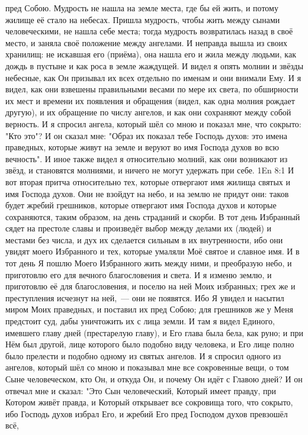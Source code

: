 пред Собою.
Мудрость не нашла на земле места, где бы ей жить, и потому
жилище её стало на небесах.
Пришла мудрость, чтобы жить между сынами человеческими, не нашла себе
места; тогда мудрость возвратилась назад в своё место, и заняла своё положение
между ангелами.
И неправда вышла из своих хранилищ: не искавшая его (приёма), она
нашла его и жила между людьми, как дождь в пустыне и как роса в земле жаждущей.
И видел я опять молнии и звёзды небесные, как Он призывал их
всех отдельно по именам и они внимали Ему.
И я видел, как они взвешены правильными весами по мере их света, по
обширности их мест и времени их появления и обращения (видел, как одна молния
рождает другую), и их обращение по числу ангелов, и как они сохраняют между
собой верность.
И я спросил ангела, который шёл со мною и показал мне, что сокрыто:
"Кто это"?
И он сказал мне: "Образ их показал тебе Господь духов: это имена
праведных, которые живут на земле и веруют во имя Господа духов во всю
вечность".
И иное также видел я относительно молний, как они возникают из
звёзд, и становятся молниями, и ничего не могут удержать при себе.
\vs 1En 8:1
И  вот вторая притча относительно тех, которые отвергают имя
жилища святых и имя Господа духов.
Они не взойдут на небо, и на землю не придут они: таков будет жребий
грешников, которые отвергают имя Господа духов и которые сохраняются, таким
образом, на день страданий и скорби.
В тот день Избранный сядет на престоле славы и произведёт выбор между
делами их (людей) и местами без числа, и дух их сделается сильным в их
внутренности, ибо они увидят моего Избранного и тех, которые умаляли Моё святое
и славное имя.
И в тот день Я пошлю Моего Избранного жить между ними, и преобразую
небо, и приготовлю его для вечного благословения и света.
И я изменю землю, и приготовлю её для благословения,  и поселю  на
ней Моих избранных; грех же и преступления исчезнут на ней,~--- они не появятся.
Ибо Я увидел и насытил миром Моих праведных, и поставил их пред Собою;
для грешников же у Меня предстоит суд, дабы уничтожить их с лица земли.
И там я видел Единого, имевшего главу дней (престарелую  главу), и
Его глава была бела, как руно; и при Нём был другой, лице которого было подобно
виду человека, и Его лице полно было прелести и подобно одному из святых
ангелов.
И я спросил одного из ангелов, который шёл со мною и показывал мне все
сокровенные вещи, о том Сыне человеческом, кто Он, и откуда Он, и почему Он
идёт с Главою дней?
И он отвечал мне и сказал: "Это Сын человеческий, Который имеет правду,
при Котором живёт правда, и Который открывает все сокровища того, что сокрыто,
ибо Господь духов избрал Его, и жребий Его пред Господом духов превзошёл всё,

